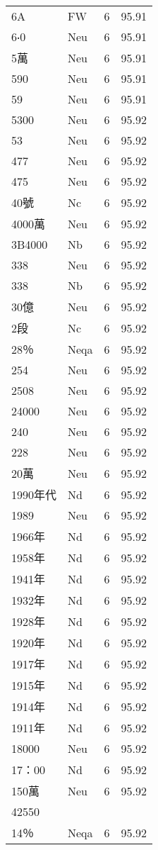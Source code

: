 \documentclass[twocolumn]{book}
\begin{document}
\begin{supertabular}{llrr}
6A & FW & 6 &  95.91\\
6‧0 & Neu & 6 &  95.91\\
5萬 & Neu & 6 &  95.91\\
590 & Neu & 6 &  95.91\\
59 & Neu & 6 &  95.91\\
5300 & Neu & 6 &  95.92\\
53 & Neu & 6 &  95.92\\
477 & Neu & 6 &  95.92\\
475 & Neu & 6 &  95.92\\
40號 & Nc & 6 &  95.92\\
4000萬 & Neu & 6 &  95.92\\
3B4000 & Nb & 6 &  95.92\\
338 & Neu & 6 &  95.92\\
338 & Nb & 6 &  95.92\\
30億 & Neu & 6 &  95.92\\
2段 & Nc & 6 &  95.92\\
28％ & Neqa & 6 &  95.92\\
254 & Neu & 6 &  95.92\\
2508 & Neu & 6 &  95.92\\
24000 & Neu & 6 &  95.92\\
240 & Neu & 6 &  95.92\\
228 & Neu & 6 &  95.92\\
20萬 & Neu & 6 &  95.92\\
1990年代 & Nd & 6 &  95.92\\
1989 & Neu & 6 &  95.92\\
1966年 & Nd & 6 &  95.92\\
1958年 & Nd & 6 &  95.92\\
1941年 & Nd & 6 &  95.92\\
1932年 & Nd & 6 &  95.92\\
1928年 & Nd & 6 &  95.92\\
1920年 & Nd & 6 &  95.92\\
1917年 & Nd & 6 &  95.92\\
1915年 & Nd & 6 &  95.92\\
1914年 & Nd & 6 &  95.92\\
1911年 & Nd & 6 &  95.92\\
18000 & Neu & 6 &  95.92\\
17：00 & Nd & 6 &  95.92\\
150萬 & Neu & 6 &  95.92\\
42550\\
14％ & Neqa & 6 &  95.92\\

\end{supertabular}
\end{document}
